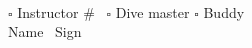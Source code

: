 \documentclass[a5paper,14pt]{extarticle}
\begin{document}
{  \vspace{4em}
  \noindent
  \phantom{}\hrulefill\\
  \phantom{}\hrulefill\\
  \phantom{}\hrulefill\\
  \phantom{}\hrulefill\\
  \phantom{}\hrulefill\\
  \phantom{}\hrulefill\\
  $\square$ Instructor \# \hrulefill\ $\square$ Dive master $\square$ Buddy\\
  Name \hrulefill\ Sign \hrulefill
  \clearpage
}
\end{document}
